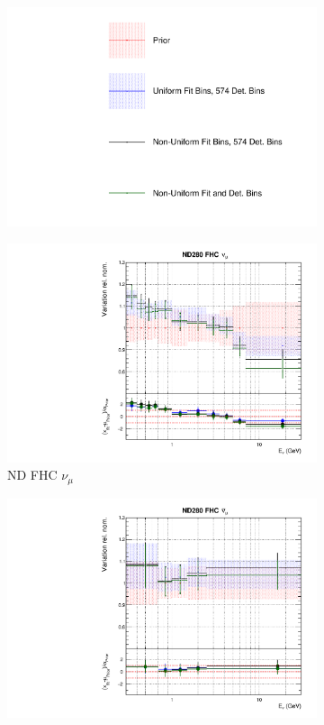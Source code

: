 \begin{figure}
\centering
\begin{subfigure}{0.95\textwidth}
  \centering
  \includegraphics[width=0.29\linewidth]{figs/polyasmvs_leg}
\end{subfigure}
\begin{subfigure}{0.24\textwidth}
  \centering
  \includegraphics[width=0.95\linewidth]{figs/polyasmvsflux_0}
  \caption{ND FHC $\nu_{\mu}$}
\end{subfigure}
\begin{subfigure}{0.24\textwidth}
  \centering
  \includegraphics[width=0.95\linewidth]{figs/polyasmvsflux_1}

\end{subfigure}
\end{figure}
